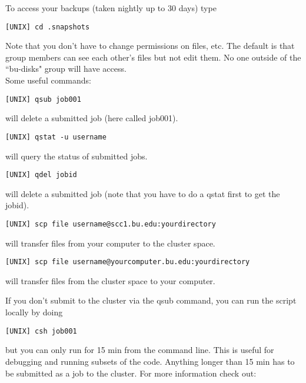 \documentclass{article}
\begin{document}
\noindent To access your backups (taken nightly up to 30 days) type

\vspace{2mm}
\texttt{[UNIX] cd .snapshots}
\vspace{2mm}

\noindent Note that you don't have to change permissions on files, etc.  The default is that group members can see each other's files but not edit them.  No one outside of the ``bu-disks" group will have access.\\

\noindent Some useful commands:

\vspace{2mm}
\texttt{[UNIX] qsub job001}
\vspace{2mm}

\noindent will delete a submitted job (here called job001).

\vspace{2mm}
\texttt{[UNIX] qstat -u username}
\vspace{2mm}

\noindent will query the status of submitted jobs.

\vspace{2mm}
\texttt{[UNIX] qdel jobid}
\vspace{2mm}

\noindent will delete a submitted job (note that you have to do a qstat first to get the jobid).

\vspace{2mm}
\texttt{[UNIX] scp file username@scc1.bu.edu:yourdirectory}
\vspace{2mm}

\noindent will transfer files from your computer to the cluster space.

\vspace{2mm}
\texttt{[UNIX] scp file username@yourcomputer.bu.edu:yourdirectory}
\vspace{2mm}

\noindent will transfer files from the cluster space to your computer.\\
\vspace{2mm}

\noindent If you don't submit to the cluster via the qsub command, you can run the script locally by doing

\vspace{2mm}
\texttt{[UNIX] csh job001}
\vspace{2mm}

\noindent but you can only run for 15 min from the command line.  This is useful for debugging and running subsets of the code. Anything longer than 15 min has to be submitted as a job to the cluster. For more information check out:
\end{document}
